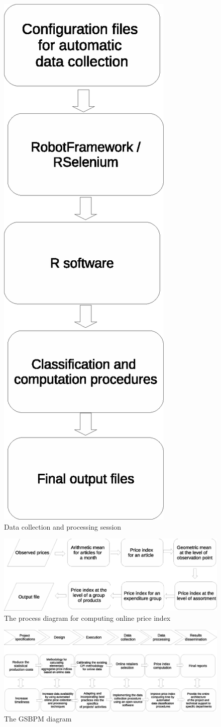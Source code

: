 \documentclass[]{article}
\begin{document}
\begin{figure}
	\centering
	\includegraphics[height=0.7\linewidth]{fig6.eps}
	\caption{Data collection and processing session}
	\label{fig:1}
\end{figure}

\clearpage

\begin{figure}
	\centering
	\includegraphics[width=0.8\linewidth]{fig1.eps}
	\caption{The process diagram for computing online price index}
	\label{fig:2}
\end{figure}

\clearpage

\begin{figure}
	\centering
	\includegraphics[width=1\linewidth]{fig2.eps}
	\caption{The GSBPM diagram}
	\label{fig:3}
\end{figure}
\end{document}
